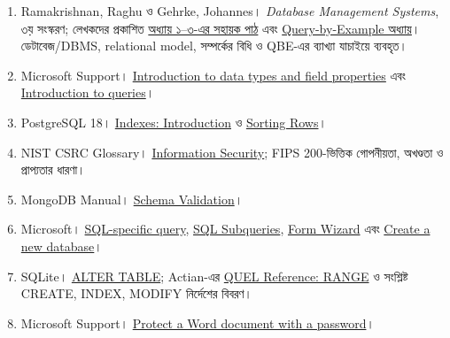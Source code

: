 \begin{enumerate}
\item Ramakrishnan, Raghu ও Gehrke, Johannes। \textit{Database Management Systems}, ৩য় সংস্করণ; লেখকদের প্রকাশিত \href{https://pages.cs.wisc.edu/~dbbook/openAccess/thirdEdition/slides/slides3ed.html}{অধ্যায় ১--৩-এর সহায়ক পাঠ} এবং \href{https://pages.cs.wisc.edu/~dbbook/openAccess/thirdEdition/qbe.pdf}{Query-by-Example অধ্যায়}। ডেটাবেজ/DBMS, relational model, সম্পর্কের বিধি ও QBE-এর ব্যাখ্যা যাচাইয়ে ব্যবহৃত।
\item Microsoft Support। \href{https://support.microsoft.com/en-us/access/introduction-to-data-types-and-field-properties}{Introduction to data types and field properties} এবং \href{https://support.microsoft.com/en-us/access/introduction-to-queries}{Introduction to queries}।
\item PostgreSQL 18। \href{https://www.postgresql.org/docs/18/indexes-intro.html}{Indexes: Introduction} ও \href{https://www.postgresql.org/docs/18/queries-order.html}{Sorting Rows}।
\item NIST CSRC Glossary। \href{https://csrc.nist.gov/glossary/term/information_security}{Information Security}; FIPS 200-ভিত্তিক গোপনীয়তা, অখণ্ডতা ও প্রাপ্যতার ধারণা।
\item MongoDB Manual। \href{https://www.mongodb.com/docs/manual/core/schema-validation/}{Schema Validation}।

\item Microsoft। \href{https://learn.microsoft.com/en-us/office/vba/access/concepts/miscellaneous/sql-specific-query}{SQL-specific query}, \href{https://support.microsoft.com/en-us/access/sql-subqueries}{SQL Subqueries}, \href{https://support.microsoft.com/en-us/access/create-a-form-by-using-the-form-wizard}{Form Wizard} এবং \href{https://support.microsoft.com/en-us/access/create-a-new-database}{Create a new database}।
\item SQLite। \href{https://sqlite.org/lang_altertable.html}{ALTER TABLE}; Actian-এর \href{https://docs.actian.com/actianx/11.1/QUELRef/RANGE--Associate_Range_Variables_with_Tables.htm}{QUEL Reference: RANGE} ও সংশ্লিষ্ট CREATE, INDEX, MODIFY নির্দেশের বিবরণ।
\item Microsoft Support। \href{https://support.microsoft.com/en-us/office/protect-a-word-document-with-a-password-05084cc3-300d-4c1a-8416-38d3e37d6826}{Protect a Word document with a password}।

\end{enumerate}
\endgroup
